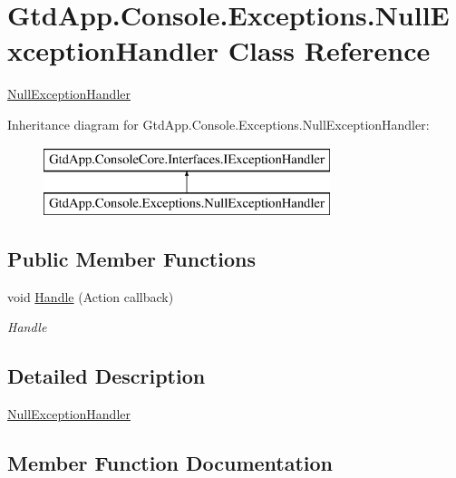 \hypertarget{class_gtd_app_1_1_console_1_1_exceptions_1_1_null_exception_handler}{}\section{Gtd\+App.\+Console.\+Exceptions.\+Null\+Exception\+Handler Class Reference}
\label{class_gtd_app_1_1_console_1_1_exceptions_1_1_null_exception_handler}


\mbox{\hyperlink{class_gtd_app_1_1_console_1_1_exceptions_1_1_null_exception_handler}{Null\+Exception\+Handler}}  


Inheritance diagram for Gtd\+App.\+Console.\+Exceptions.\+Null\+Exception\+Handler\+:\begin{figure}[H]
\begin{center}
\leavevmode
\includegraphics[height=2.000000cm]{class_gtd_app_1_1_console_1_1_exceptions_1_1_null_exception_handler}
\end{center}
\end{figure}
\subsection*{Public Member Functions}
\begin{DoxyCompactItemize}
\item 
void \mbox{\hyperlink{class_gtd_app_1_1_console_1_1_exceptions_1_1_null_exception_handler_a78f13c93cb7c384268b06b609abbce9f}{Handle}} (Action callback)
\begin{DoxyCompactList}\small\item\em Handle \end{DoxyCompactList}\end{DoxyCompactItemize}


\subsection{Detailed Description}
\mbox{\hyperlink{class_gtd_app_1_1_console_1_1_exceptions_1_1_null_exception_handler}{Null\+Exception\+Handler}} 



\subsection{Member Function Documentation}
\mbox{\label{class_gtd_app_1_1_console_1_1_exceptions_1_1_null_exception_handler_a78f13c93cb7c384268b06b609abbce9f}} 
